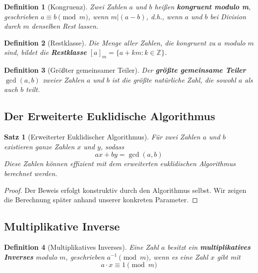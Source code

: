﻿\documentclass[12pt,a4paper]{article}
\newtheorem{theorem}{Satz}
\newtheorem{definition}{Definition}
\begin{document}
	\begin{definition}[Kongruenz]
		Zwei Zahlen $a$ und $b$ heißen \textbf{kongruent modulo m}, geschrieben $a \equiv b \pmod{m}$, wenn $m | (a-b)$, d.h., wenn $a$ und $b$ bei Division durch $m$ denselben Rest lassen.
	\end{definition}
	
	\begin{definition}[Restklasse]
		Die Menge aller Zahlen, die kongruent zu $a$ modulo $m$ sind, bildet die \textbf{Restklasse} $[a]_m = \{a + km : k \in \mathbb{Z}\}$.
	\end{definition}
	
	\begin{definition}[Größter gemeinsamer Teiler]
		Der \textbf{größte gemeinsame Teiler} $\gcd(a,b)$ zweier Zahlen $a$ und $b$ ist die größte natürliche Zahl, die sowohl $a$ als auch $b$ teilt.
	\end{definition}
	
	\subsection{Der Erweiterte Euklidische Algorithmus}
	
	\begin{theorem}[Erweiterter Euklidischer Algorithmus]
		Für zwei Zahlen $a$ und $b$ existieren ganze Zahlen $x$ und $y$, sodass
		\begin{equation}
			ax + by = \gcd(a,b)
		\end{equation}
		Diese Zahlen können effizient mit dem erweiterten euklidischen Algorithmus berechnet werden.
	\end{theorem}
	
	\begin{proof}
		Der Beweis erfolgt konstruktiv durch den Algorithmus selbst. Wir zeigen die Berechnung später anhand unserer konkreten Parameter.
	\end{proof}
	
	\subsection{Multiplikative Inverse}
	
	\begin{definition}[Multiplikatives Inverses]
		Eine Zahl $a$ besitzt ein \textbf{multiplikatives Inverses} modulo $m$, geschrieben $a^{-1} \pmod{m}$, wenn es eine Zahl $x$ gibt mit
		\begin{equation}
			a \cdot x \equiv 1 \pmod{m}
		\end{equation}
	\end{definition}
	
\end{document}
